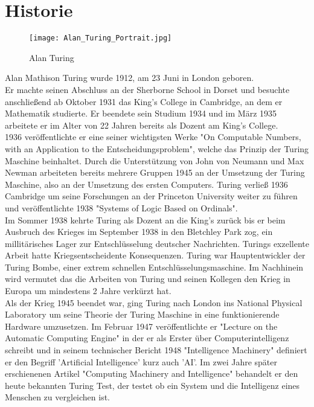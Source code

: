 \section{Historie}

\begin{wrapfigure}{r}{5cm}

\texttt{[image: Alan\_Turing\_Portrait.jpg]}
\caption{Alan Turing}
\label{fig:turing}
\end{wrapfigure}

Alan Mathison Turing wurde 1912, am 23 Juni in London geboren.\\
Er machte seinen Abschluss an der Sherborne School in Dorset und besuchte anschließend ab Oktober 1931 das King's College in Cambridge, an dem er Mathematik studierte. Er beendete sein Studium 1934 und im März 1935 arbeitete er im Alter von 22 Jahren bereits als Dozent am King's College.\\
1936 veröffentlichte er eine seiner wichtigsten Werke "On Computable Numbers, with an Application to the Entscheidungsproblem", welche das Prinzip der Turing Maschine beinhaltet. Durch die Unterstützung von John von Neumann und Max Newman arbeiteten bereits mehrere Gruppen 1945 an der Umsetzung der Turing Maschine, also an der Umsetzung des ersten Computers. Turing verließ 1936 Cambridge um seine Forschungen an der Princeton University weiter zu führen und veröffentlichte 1938 "Systems of Logic Based on Ordinals".\\ 
Im Sommer 1938 kehrte Turing als Dozent an die King's zurück bis er beim Ausbruch des Krieges im September 1938 in den Bletchley Park zog, ein millitärisches Lager zur Entschlüsselung deutscher Nachrichten. Turings exzellente Arbeit hatte Kriegsentscheidente Konsequenzen. Turing war Hauptentwickler der Turing Bombe, einer extrem schnellen Entschlüsselungsmaschine. Im Nachhinein wird vermutet das die Arbeiten von Turing und seinen Kollegen den Krieg in Europa um mindestens 2 Jahre verkürzt hat.\\
Als der Krieg 1945 beendet war, ging Turing nach London ins National Physical Laboratory um seine Theorie der Turing Maschine in eine funktionierende Hardware umzusetzen. Im Februar 1947 veröffentlichte er "Lecture on the Automatic Computing Engine" in der er als Erster über Computerintelligenz schreibt und in seinem technischer Bericht 1948 "Intelligence Machinery" definiert er den Begriff 'Artificial Intelligence' kurz auch 'AI'. Im zwei Jahre später erschienenen Artikel "Computing Machinery and Intelligence" behandelt er den heute bekannten Turing Test, der testet ob ein System und die Intelligenz eines Menschen zu vergleichen ist.
